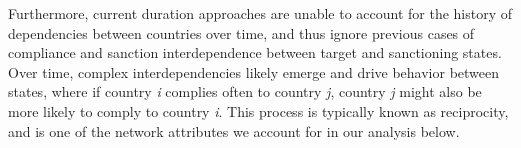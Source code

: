 Furthermore, current duration approaches are unable to account for the history of dependencies between countries over time, and thus ignore previous cases of compliance and sanction interdependence between target and sanctioning states.  Over time, complex interdependencies likely emerge and drive behavior between states, where if country \textit{i} complies often to country \textit{j}, country \textit{j} might also be more likely to comply to country \textit{i}. This process is typically known as reciprocity, and is one of the network attributes we account for in our analysis below. 




